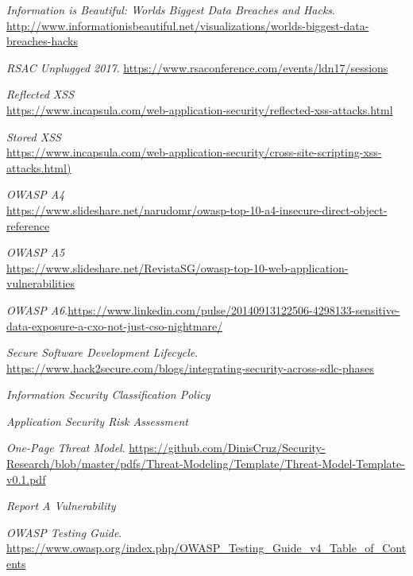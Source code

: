\documentclass[a5paper,pagesize,10pt,bibtotoc,DIV=10,twoside]{scrbook}
\begin{document}
\backmatter

\begin{thebibliography}{99}
\small
{} 
\textit{Information is Beautiful: Worlds Biggest Data Breaches and Hacks}. 
\url{http://www.informationisbeautiful.net/visualizations/worlds-biggest-data-breaches-hacks}

\textit{RSAC Unplugged 2017}.
\url{https://www.rsaconference.com/events/ldn17/sessions}

\textit{Reflected XSS}\\
\url{https://www.incapsula.com/web-application-security/reflected-xss-attacks.html}

\textit{Stored XSS}\\
\url{https://www.incapsula.com/web-application-security/cross-site-scripting-xss-attacks.html)}

\textit{OWASP A4}\\
\url{https://www.slideshare.net/narudomr/owasp-top-10-a4-insecure-direct-object-reference}

\textit{OWASP A5}\\
\url{https://www.slideshare.net/RevistaSG/owasp-top-10-web-application-vulnerabilities}

\textit{OWASP A6}.\url{https://www.linkedin.com/pulse/20140913122506-4298133-sensitive-data-exposure-a-cxo-not-just-cso-nightmare/}

\textit{Secure Software Development Lifecycle}. \url{https://www.hack2secure.com/blogs/integrating-security-across-sdlc-phases}

\textit{Information Security Classification Policy}

\textit{Application Security Risk Assessment}

\textit{One-Page Threat Model}. \url{https://github.com/DinisCruz/Security-Research/blob/master/pdfs/Threat-Modeling/Template/Threat-Model-Template-v0.1.pdf}

\textit{Report A Vulnerability }

\textit{OWASP Testing Guide}. \url{https://www.owasp.org/index.php/OWASP_Testing_Guide_v4_Table_of_Contents}

\end{thebibliography}
\end{document}
